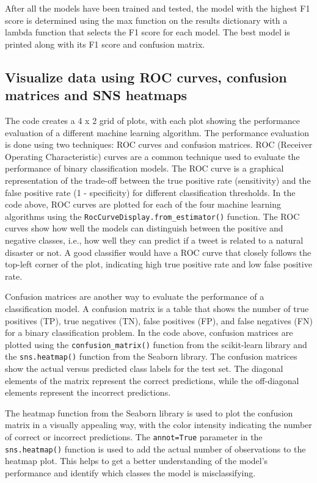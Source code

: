 \documentclass[11pt]{diazessay} %
\begin{document}
After all the models have been trained and tested, the model with the highest F1 score is determined using the max function on the results dictionary with a lambda function that selects the F1 score for each model. The best model is printed along with its F1 score and confusion matrix.

\subsection{Visualize data using ROC curves, confusion matrices and SNS heatmaps}

The code creates a 4 x 2 grid of plots, with each plot showing the performance evaluation of a different machine learning algorithm. The performance evaluation is done using two techniques: ROC curves and confusion matrices. ROC (Receiver Operating Characteristic) curves are a common technique used to evaluate the performance of binary classification models. The ROC curve is a graphical representation of the trade-off between the true positive rate (sensitivity) and the false positive rate (1 - specificity) for different classification thresholds. In the code above, ROC curves are plotted for each of the four machine learning algorithms using the \verb|RocCurveDisplay.from_estimator()| function. The ROC curves show how well the models can distinguish between the positive and negative classes, i.e., how well they can predict if a tweet is related to a natural disaster or not. A good classifier would have a ROC curve that closely follows the top-left corner of the plot, indicating high true positive rate and low false positive rate.

Confusion matrices are another way to evaluate the performance of a classification model. A confusion matrix is a table that shows the number of true positives (TP), true negatives (TN), false positives (FP), and false negatives (FN) for a binary classification problem. In the code above, confusion matrices are plotted using the \verb|confusion_matrix()| function from the scikit-learn library and the \verb|sns.heatmap()| function from the Seaborn library. The confusion matrices show the actual versus predicted class labels for the test set. The diagonal elements of the matrix represent the correct predictions, while the off-diagonal elements represent the incorrect predictions.

The heatmap function from the Seaborn library is used to plot the confusion matrix in a visually appealing way, with the color intensity indicating the number of correct or incorrect predictions. The \verb|annot=True| parameter in the \verb|sns.heatmap()| function is used to add the actual number of observations to the heatmap plot. This helps to get a better understanding of the model's performance and identify which classes the model is misclassifying.
\end{document}
